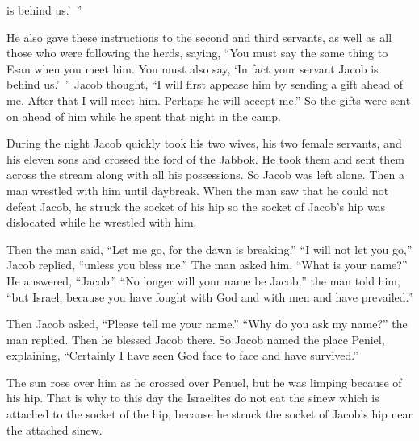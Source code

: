 {is
behind us.’ ”
\par }{\PP {}He also
gave these instructions
to the
second
and third
servants, as well
as all
those
who were following
the herds,
saying,
“You must say
the same
thing
to
Esau
when
you meet him.
You must also
say,
‘In fact
your servant
Jacob
is behind
us.’ ” Jacob thought, “I will first appease
him by
sending a gift
ahead
of me. After
that
I will meet
him. Perhaps
he will accept me.”
So
the gifts
were sent on
ahead
of him while
he spent
that night
in the camp.
\par }{\PP {}During
the night
Jacob quickly took
his two
wives,
his two
female servants,
and his eleven
sons
and crossed
the ford
of the Jabbok.
He took
them
and sent them across
the stream
along
with all his possessions.
So Jacob
was left
alone.
Then a man wrestled
with
him until
daybreak.
When the man saw
that
he could
not
defeat Jacob, he struck
the socket
of his hip
so the socket
of Jacob’s
hip
was dislocated
while he wrestled
with him.
\par }{\PP {}Then the man said,
“Let me
go,
for
the dawn
is breaking.” “I will not
let
you go,”
Jacob replied, “unless
you bless me.”
The man asked
him, “What
is your name?” He answered,
“Jacob.”
“No
longer
will your name
be Jacob,”
the man told
him, “but
Israel,
because
you have fought
with
God
and with
men
and have prevailed.”
\par }{\PP {}Then Jacob
asked,
“Please tell
me
your name.” “Why
do you ask
my name?” the man
replied. Then he blessed
Jacob there.
So
Jacob
named
the place
Peniel,
explaining, “Certainly
I have seen
God
face
to
face
and have survived.”
\par }{\PP {}The sun
rose
over him as he crossed over
Penuel,
but he was limping
because of his hip.
That is why
to this
day
the Israelites
do not
eat
the
sinew
which
is attached
to the
socket
of the hip,
because
he struck
the socket
of Jacob’s
hip
near the attached sinew.

}
